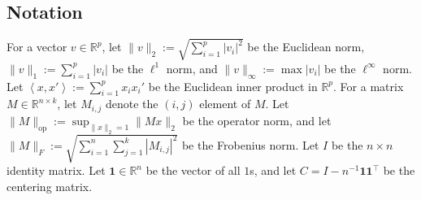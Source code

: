 \documentclass[twoside, onecolumn]{article}
\def\R{\mathbb{R}}
\begin{document}



\subsection{Notation} 
For a vector $v\in \R^p$, let $\|v\|_{2}:=\sqrt{\sum_{i=1}^{p}|v_i|^2}$ be the Euclidean norm, $\|v\|_{1}:=\sum_{i=1}^{p}|v_i|$ be the $\ell^1$ norm, and $\|v\|_\infty:=\max|v_i|$ be the $\ell^\infty$ norm. Let $\left<x, x'\right>:=\sum_{i=1}^{p}x_{i}x_{i}'$ be the Euclidean inner product in $\mathbb{R}^p$.
For a matrix $M\in \mathbb{R}^{n\times k}$, let $M_{i,j}$ denote the $(i,j)$ element of $M$. Let $\|M\|_{\text{op}}:=\sup_{\|x\|_2=1} \|Mx\|_{2}$ be the operator norm, and let $\|M\|_{F}:= \sqrt{\sum_{i=1}^{n}\sum_{j=1}^{k} |M_{i,j}|^{2}}$ be the Frobenius norm. Let $I$ be the $n\times n$ identity matrix.  Let $\mathbf{1}\in \mathbb{R}^{n}$ be the vector of all $1$s, and let $C= I-n^{-1} \mathbf{1} \mathbf{1}^{\top}$ be the centering matrix. 
\end{document}

